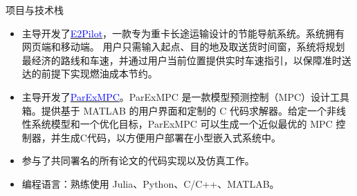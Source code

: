 \documentclass{resume} %
\begin{document}
\begin{rSection}{项目与技术栈}
    \begin{itemize}
        \item 主导开发了\href{https://www.e2pilots.com/}{\textcolor{blue}{E2Pilot}}，一款专为重卡长途运输设计的节能导航系统。系统拥有网页端和移动端。
        用户只需输入起点、目的地及取送货时间窗，系统将规划最经济的路线和车速，并通过用户当前位置提供实时车速指引，以保障准时送达的前提下实现燃油成本节约。
        \item 主导开发了\href{https://github.com/sujunyan/ParExMPC}{\textcolor{blue}{ParExMPC}}。ParExMPC 是一款模型预测控制（MPC）设计工具箱。提供基于 MATLAB 的用户界面和定制的 C 代码求解器。给定一个非线性系统模型和一个优化目标，ParExMPC 可以生成一个近似最优的 MPC 控制器，并生成C代码，以方便用户部署在小型嵌入式系统中。
        \item 参与了共同署名的所有论文的代码实现以及仿真工作。 
        \item 编程语言：熟练使用 Julia、Python、C/C++、MATLAB。
    \end{itemize}
\end{rSection}


\end{document}
